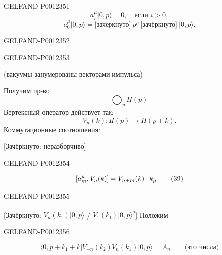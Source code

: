 \begin{GelfandAdjacentEvidence}{GELFAND-P001235}{1}
\begin{equation*}
a_i^\mu|0,p\rangle=0,\quad\text{если }i>0,
\tag*{$(36)_i$}
\end{equation*}
\begin{equation*}
a_0^\mu|0,p\rangle=
\text{[зачёркнуто]}\ p^\mu\,\text{[зачёркнуто]}\ |0,p\rangle.
\tag*{$(36)_0$}
\end{equation*}
\end{GelfandAdjacentEvidence}
\begin{GelfandAdjacentEvidence}{GELFAND-P001235}{2}

\end{GelfandAdjacentEvidence}
\begin{GelfandAdjacentEvidence}{GELFAND-P001235}{3}

(вакуумы занумерованы векторами импульса)

Получим пр-во
\begin{equation*}
\bigoplus_p H(p)
\tag{37}
\end{equation*}
Вертексный оператор действует так:
\begin{equation*}
V_n(k):H(p)\longrightarrow H(p+k).
\tag{38}
\end{equation*}
Коммутационные соотношения:

[Зачёркнуто: неразборчиво]
\end{GelfandAdjacentEvidence}
\begin{GelfandAdjacentEvidence}{GELFAND-P001235}{4}

\begin{equation*}
\relax [a_m^\mu,V_n(k)]=V_{n+m}(k)\cdot k_\mu
\tag{39}
\end{equation*}
\end{GelfandAdjacentEvidence}
\begin{GelfandAdjacentEvidence}{GELFAND-P001235}{5}


[Зачёркнуто: $V_n(k_1)|0,p\rangle$ / $V_1(k_1)|0,p\rangle$\textsuperscript{?}] Положим
\end{GelfandAdjacentEvidence}
\begin{GelfandAdjacentEvidence}{GELFAND-P001235}{6}

\begin{equation*}
\langle0,p+k_1+k|V_{-n}(k_2)V_n(k_1)|0,p\rangle=A_n\qquad\text{(это числа)}
\tag{40}
\end{equation*}
\end{GelfandAdjacentEvidence}


